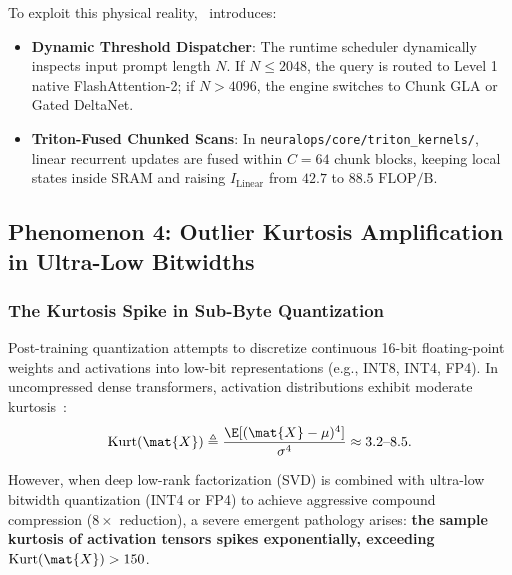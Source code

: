 To exploit this physical reality, \neuralops\ introduces:
\begin{itemize}
    \item \textbf{Dynamic Threshold Dispatcher}: The runtime scheduler dynamically inspects input prompt length $N$. If $N \le 2048$, the query is routed to Level 1 native FlashAttention-2; if $N > 4096$, the engine switches to Chunk GLA or Gated DeltaNet.
    \item \textbf{Triton-Fused Chunked Scans}: In \texttt{neuralops/core/triton\_kernels/}, linear recurrent updates are fused within $C=64$ chunk blocks, keeping local states inside SRAM and raising $I_{\text{Linear}}$ from $42.7$ to $88.5\text{ FLOP/B}$.
\end{itemize}

\subsection{Phenomenon 4: Outlier Kurtosis Amplification in Ultra-Low Bitwidths}
\label{sec:phenom_kurtosis_amplification}

\subsubsection{The Kurtosis Spike in Sub-Byte Quantization}
\label{sec:phenom_kurtosis_spike}

Post-training quantization attempts to discretize continuous 16-bit floating-point weights and activations into low-bit representations (e.g., INT8, INT4, FP4). In uncompressed dense transformers, activation distributions exhibit moderate kurtosis~\cite{dettmers2022llmint8}:
\begin{equation}
\operatorname{Kurt}(\mat{X}) \triangleq \frac{\E[(\mat{X} - \mu)^4]}{\sigma^4} \approx 3.2\text{--}8.5.
\end{equation}

However, when deep low-rank factorization (SVD) is combined with ultra-low bitwidth quantization (INT4 or FP4) to achieve aggressive compound compression ($8\times$ reduction), a severe emergent pathology arises: \textbf{the sample kurtosis of activation tensors spikes exponentially, exceeding $\operatorname{Kurt}(\mat{X}) > 150$}.

